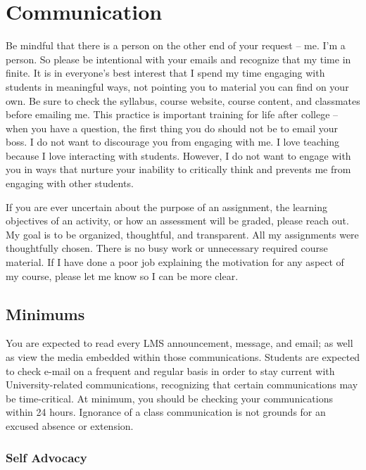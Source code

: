 \hypertarget{communication}{%
\chapter{Communication}\label{communication}}

Be mindful that there is a person on the other end of your request -- me. I'm a person. So please be intentional with your emails and recognize that my time in finite. It is in everyone's best interest that I spend my time engaging with students in meaningful ways, not pointing you to material you can find on your own. Be sure to check the syllabus, course website, course content, and classmates before emailing me. This practice is important training for life after college -- when you have a question, the first thing you do should not be to email your boss. I do not want to discourage you from engaging with me. I love teaching because I love interacting with students. However, I do not want to engage with you in ways that nurture your inability to critically think and prevents me from engaging with other students.

If you are ever uncertain about the purpose of an assignment, the learning objectives of an activity, or how an assessment will be graded, please reach out. My goal is to be organized, thoughtful, and transparent. All my assignments were thoughtfully chosen. There is no busy work or unnecessary required course material. If I have done a poor job explaining the motivation for any aspect of my course, please let me know so I can be more clear.

\hypertarget{minimums}{%
\section{Minimums}\label{minimums}}

You are expected to read every LMS announcement, message, and email; as well as view the media embedded within those communications. Students are expected to check e-mail on a frequent and regular basis in order to stay current with University-related communications, recognizing that certain communications may be time-critical. At minimum, you should be checking your communications within 24 hours. Ignorance of a class communication is not grounds for an excused absence or extension.

\hypertarget{self-advocacy-1}{%
\subsection{Self Advocacy}\label{self-advocacy-1}}

